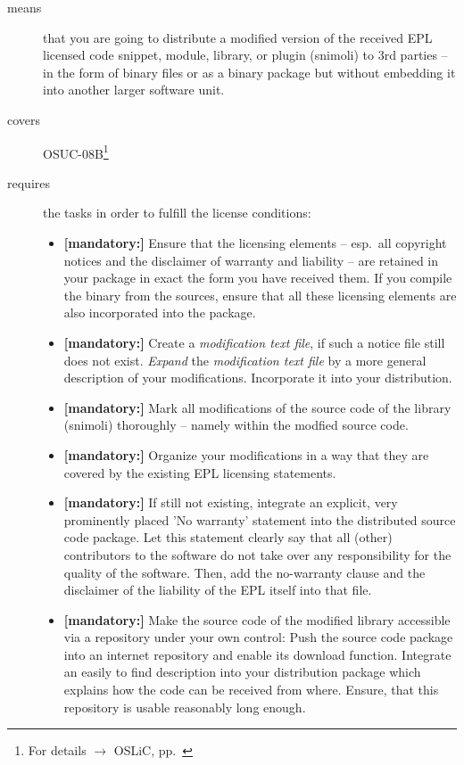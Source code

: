 \begin{description}
\item[means] that you are going to distribute a modified version of the received
EPL licensed code snippet, module, library, or plugin (snimoli) to 3rd parties
-- in the form of binary files or as a binary package but without embedding it
into another larger software unit.
\item[covers] OSUC-08B\footnote{For details $\rightarrow$ OSLiC, pp.\
\pageref{OSUC-08B-DEF}}
\item[requires] the tasks in order to fulfill the license conditions:
\begin{itemize}

  \item \textbf{[mandatory:]} Ensure that the licensing elements -- esp.\ all
  copyright notices and the disclaimer of warranty and liability -- are retained
  in your package in exact the form you have received them. If you compile the
  binary from the sources, ensure that all these licensing elements are also
  incorporated into the package.

  \item \textbf{[mandatory:]} Create a \emph{modification text file}, if such a
  notice file still does not exist. \emph{Expand} the \emph{modification text
  file} by a more general description of your modifications. Incorporate it into
  your distribution.

  \item \textbf{[mandatory:]} Mark all modifications of the source code of the
  library (snimoli) thoroughly -- namely within the modfied source code.

  \item \textbf{[mandatory:]} Organize your modifications in a way that they are
  covered by the existing EPL licensing statements.
  
  \item \textbf{[mandatory:]} If still not existing, integrate an explicit, very
  prominently placed 'No warranty' statement into the distributed source code
  package. Let this statement clearly say that all (other) contributors to the
  software do not take over any responsibility for the quality of the software.
  Then, add the no-warranty clause and the disclaimer of the liability of the
  EPL itself into that file.
  
  \item \textbf{[mandatory:]} Make the source code of the modified library
  accessible via a repository under your own control: Push the source code
  package into an internet repository and enable its download function.
  Integrate an easily to find description into your distribution package which
  explains how the code can be received from where. Ensure, that this repository
  is usable reasonably long enough.
  

\end{itemize}
\end{description}
